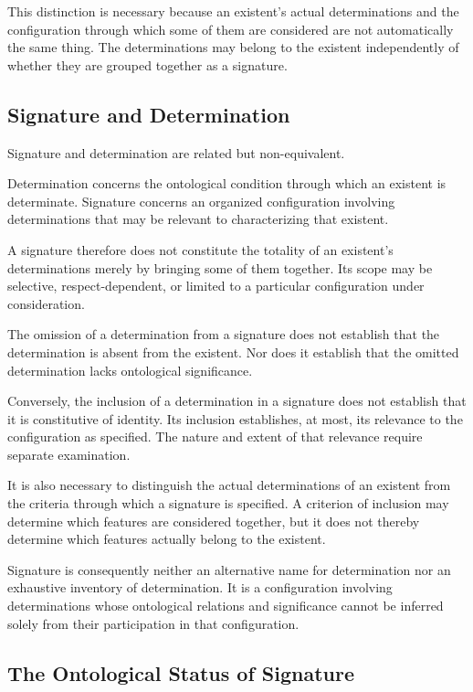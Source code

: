 This distinction is necessary because an existent's
actual determinations and the configuration through
which some of them are considered are not automatically
the same thing. The determinations may belong to the
existent independently of whether they are grouped
together as a signature.

\subsection{Signature and Determination}

Signature and determination are related but non-equivalent.

Determination concerns the ontological condition through
which an existent is determinate. Signature concerns an
organized configuration involving determinations that
may be relevant to characterizing that existent.

A signature therefore does not constitute the totality
of an existent's determinations merely by bringing
some of them together. Its scope may be selective,
respect-dependent, or limited to a particular
configuration under consideration.

The omission of a determination from a signature does
not establish that the determination is absent from
the existent. Nor does it establish that the omitted
determination lacks ontological significance.

Conversely, the inclusion of a determination in a
signature does not establish that it is constitutive
of identity. Its inclusion establishes, at most, its
relevance to the configuration as specified. The
nature and extent of that relevance require separate
examination.

It is also necessary to distinguish the actual
determinations of an existent from the criteria through
which a signature is specified. A criterion of inclusion
may determine which features are considered together,
but it does not thereby determine which features
actually belong to the existent.

Signature is consequently neither an alternative
name for determination nor an exhaustive inventory
of determination. It is a configuration involving
determinations whose ontological relations and
significance cannot be inferred solely from their
participation in that configuration.

\subsection{The Ontological Status of Signature}

